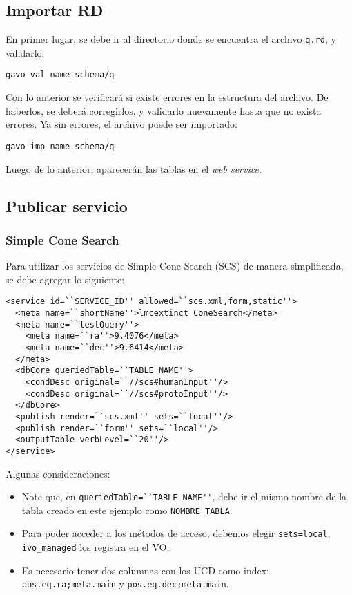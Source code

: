 \subsection*{Importar RD}

En primer lugar, se debe ir al directorio donde se encuentra el archivo \verb;q.rd;, y validarlo:

\begin{verbatim}
gavo val name_schema/q
\end{verbatim}

Con lo anterior se verificará si existe errores en la estructura del archivo. De haberlos, se deberá corregirlos, y validarlo nuevamente hasta que no exista errores. Ya sin errores, el archivo puede ser importado:

\begin{verbatim}
gavo imp name_schema/q
\end{verbatim}

Luego de lo anterior, aparecerán las tablas en el \emph{web service}.

\subsection*{Publicar servicio}

\subsubsection*{Simple Cone Search}

Para utilizar los servicios de Simple Cone Search (SCS) de manera simplificada, se debe agregar lo siguiente:

\begin{verbatim}
<service id=``SERVICE_ID'' allowed=``scs.xml,form,static''>
  <meta name=``shortName''>lmcextinct ConeSearch</meta>
  <meta name=``testQuery''>
    <meta name=``ra''>9.4076</meta>
    <meta name=``dec''>9.6414</meta>
  </meta>
  <dbCore queriedTable=``TABLE_NAME''>
    <condDesc original=``//scs#humanInput''/>
    <condDesc original=``//scs#protoInput''/>
  </dbCore>
  <publish render=``scs.xml'' sets=``local''/>
  <publish render=``form'' sets=``local''/>
  <outputTable verbLevel=``20''/>
</service>
\end{verbatim}

Algunas consideraciones:

\begin{itemize}
	\item Note que, en \verb;queriedTable=``TABLE_NAME'';, debe ir el mismo nombre de la tabla creado en este ejemplo como \verb;NOMBRE_TABLA;.
	\item Para poder acceder a los métodos de acceso, debemos elegir \verb;sets=local;, \verb;ivo_managed; los registra en el VO.
	\item Es necesario tener dos columnas con los UCD como index: \verb:pos.eq.ra;meta.main: y \verb:pos.eq.dec;meta.main:.
\end{itemize}

